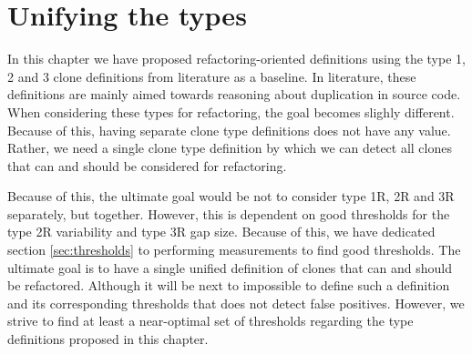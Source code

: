 \section{Unifying the types}
In this chapter we have proposed refactoring-oriented definitions using the type 1, 2 and 3 clone definitions from literature as a baseline. In literature, these definitions are mainly aimed towards reasoning about duplication in source code. When considering these types for refactoring, the goal becomes slighly different. Because of this, having separate clone type definitions does not have any value. Rather, we need a single clone type definition by which we can detect all clones that can and should be considered for refactoring.

Because of this, the ultimate goal would be not to consider type 1R, 2R and 3R separately, but together. However, this is dependent on good thresholds for the type 2R variability and type 3R gap size. Because of this, we have dedicated section \ref{sec:thresholds} to performing measurements to find good thresholds. The ultimate goal is to have a single unified definition of clones that can and should be refactored. Although it will be next to impossible to define such a definition and its corresponding thresholds that does not detect false positives. However, we strive to find at least a near-optimal set of thresholds regarding the type definitions proposed in this chapter.


